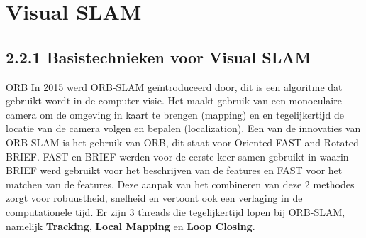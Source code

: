 \section{Visual SLAM}\label{sec:visual-slam}

\subsection{2.2.1 Basistechnieken voor Visual SLAM}\label{subsec:2.2.1-basistechnieken-voor-visual-slam}

ORB
    In 2015 werd ORB-SLAM geïntroduceerd door\textcite{Mur_Artal_2015}, dit is een algoritme dat gebruikt wordt in de computer-visie.
    Het maakt gebruik van een monoculaire camera om de omgeving in kaart te brengen (mapping) en en tegelijkertijd de locatie van de camera volgen en bepalen (localization).
    Een van de innovaties van ORB-SLAM is het gebruik van ORB, dit staat voor Oriented FAST and Rotated BRIEF\@.
    FAST en BRIEF werden voor de eerste keer samen gebruikt in \textcite{6202705}waarin BRIEF werd gebruikt voor het beschrijven van de features en FAST voor het matchen van de features.
    Deze aanpak van het combineren van deze 2 methodes zorgt voor robuustheid, snelheid en vertoont ook een verlaging in de computationele tijd.
    Er zijn 3 threads die tegelijkertijd lopen bij ORB-SLAM, namelijk \textbf{Tracking}, \textbf{Local Mapping} en \textbf{Loop Closing}.


